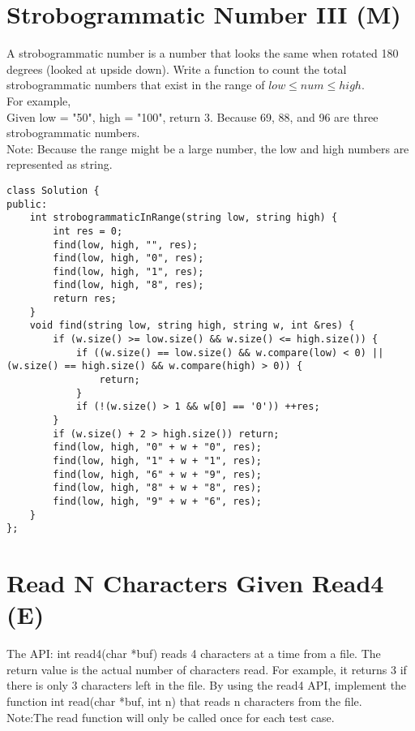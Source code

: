 \section{Strobogrammatic Number III (M)}
A strobogrammatic number is a number that looks the same when rotated 180 degrees (looked at upside down). Write a function to count the total strobogrammatic numbers that exist in the range of $low \leq num \leq high$. \\

For example,\\
Given low = "50", high = "100", return 3. Because 69, 88, and 96 are three strobogrammatic numbers. \\

Note: Because the range might be a large number, the low and high numbers are represented as string.\\

\begin{lstlisting}
class Solution {
public:
    int strobogrammaticInRange(string low, string high) {
        int res = 0;
        find(low, high, "", res);
        find(low, high, "0", res);
        find(low, high, "1", res);
        find(low, high, "8", res);
        return res;
    }
    void find(string low, string high, string w, int &res) {
        if (w.size() >= low.size() && w.size() <= high.size()) {
            if ((w.size() == low.size() && w.compare(low) < 0) || (w.size() == high.size() && w.compare(high) > 0)) {
                return;
            }
            if (!(w.size() > 1 && w[0] == '0')) ++res;
        }
        if (w.size() + 2 > high.size()) return;
        find(low, high, "0" + w + "0", res);
        find(low, high, "1" + w + "1", res);
        find(low, high, "6" + w + "9", res);
        find(low, high, "8" + w + "8", res);
        find(low, high, "9" + w + "6", res);
    }
};
\end{lstlisting}


\section{Read N Characters Given Read4 (E)}
The API: int read4(char *buf) reads 4 characters at a time from a file. The return value is the actual number of characters read. For example, it returns 3 if there is only 3 characters left in the file. By using the read4 API, implement the function int read(char *buf, int n) that reads n characters from the file.\\

Note:The read function will only be called once for each test case.\\

